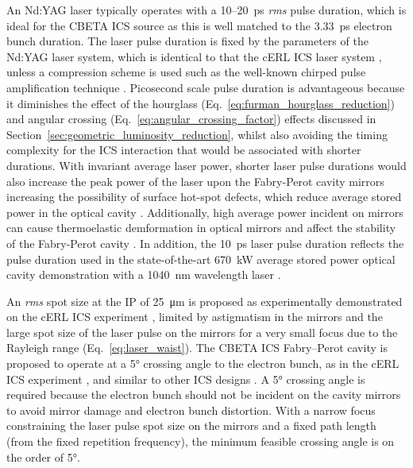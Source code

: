 \documentclass[../main.tex]{subfiles}
\begin{document}
An Nd:YAG laser typically operates with a 10--20~\si{\pico\second} \textit{rms} pulse duration, which is ideal for the CBETA ICS source as this is well matched to the 3.33~\si{\pico\second} electron bunch duration. The laser pulse duration is fixed by the parameters of the Nd:YAG laser system, which is identical to that the cERL ICS laser system \cite{akagi}, unless a compression scheme is used such as the well-known chirped pulse amplification technique \cite{strickland1985compression}. Picosecond scale pulse duration is advantageous because it diminishes the effect of the hourglass (Eq.~\ref{eq:furman_hourglass_reduction}) and angular crossing (Eq.~\ref{eq:angular_crossing_factor}) effects \cite{miyahara2008luminosity} discussed in Section~\ref{sec:geometric_luminosity_reduction}, whilst also avoiding the timing complexity for the ICS interaction that would be associated with shorter durations. With invariant average laser power, shorter laser pulse durations would also increase the peak power of the laser upon the Fabry-Perot cavity mirrors increasing the possibility of surface hot-spot defects, which reduce average stored power in the optical cavity \cite{wang2020prior}. Additionally, high average power incident on mirrors can cause thermoelastic demformation in optical mirrors and affect the stability of the Fabry-Perot cavity \cite{chaikovska2016high}. In addition, the 10~\si{\pico\second} laser pulse duration reflects the pulse duration used in the state-of-the-art 670~\si{\kilo\watt} average stored power optical cavity demonstration with a 1040~\si{\nano\meter} wavelength laser \cite{carstens2014megawatt}.     

An \textit{rms} spot size at the IP of 25~\si{\micro\meter} is proposed as experimentally demonstrated on the cERL ICS experiment \cite{akagi2016narrow}, limited by astigmatism in the mirrors and the large spot size of the laser pulse on the mirrors for a very small focus due to the Rayleigh range (Eq.~\ref{eq:laser_waist}). The CBETA ICS Fabry--Perot cavity is proposed to operate at a 5\si{\degree} crossing angle to the electron bunch, as in the cERL ICS experiment \cite{akagi2016narrow}, and similar to other ICS designs \cite{faillace2019status,variola2014thomx}. A 5\si{\degree} crossing angle is required because the electron bunch should not be incident on the cavity mirrors to avoid mirror damage and electron bunch distortion. With a narrow focus constraining the laser pulse spot size on the mirrors and a fixed path length (from the fixed repetition frequency), the minimum feasible crossing angle is on the order of 5\si{\degree}.   
\end{document}
